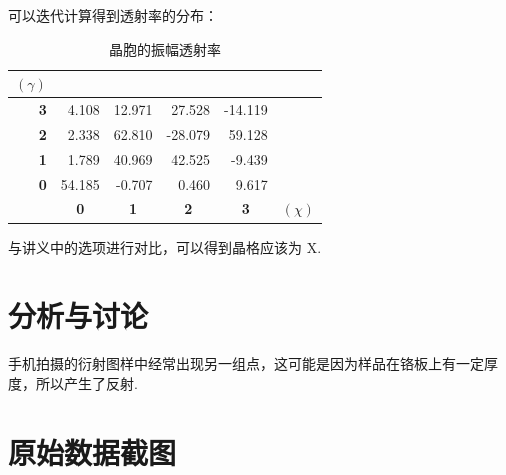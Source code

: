 \documentclass{customDoc}
\begin{document}
可以迭代计算得到透射率的分布：

\begin{table}[H]
  \centering
    \begin{tabular}{|r|c|c|c|c|l|}
    \hline
    $(\gamma)$ &       &       &       &       &  \\
    \hline
    \textbf{3} & \multicolumn{1}{r|}{4.108} & \multicolumn{1}{r|}{12.971} & \multicolumn{1}{r|}{27.528} & \multicolumn{1}{r|}{-14.119} &  \\
    \hline
    \textbf{2} & \multicolumn{1}{r|}{2.338} & \multicolumn{1}{r|}{62.810} & \multicolumn{1}{r|}{-28.079} & \multicolumn{1}{r|}{59.128} &  \\
    \hline
    \textbf{1} & \multicolumn{1}{r|}{1.789} & \multicolumn{1}{r|}{40.969} & \multicolumn{1}{r|}{42.525} & \multicolumn{1}{r|}{-9.439} &  \\
    \hline
    \textbf{0} & \multicolumn{1}{r|}{54.185} & \multicolumn{1}{r|}{-0.707} & \multicolumn{1}{r|}{0.460} & \multicolumn{1}{r|}{9.617} &  \\
    \hline
          & \textbf{0} & \textbf{1} & \textbf{2} & \textbf{3} & $(\chi)$ \\
    \hline
    \end{tabular}%
    \caption{晶胞的振幅透射率}
  \label{tab:addlabel}%
\end{table}%

与讲义中的选项进行对比，可以得到晶格应该为 X.

\section{分析与讨论}

手机拍摄的衍射图样中经常出现另一组点，这可能是因为样品在铬板上有一定厚度，所以产生了反射.

\section{原始数据截图}
\end{document}
